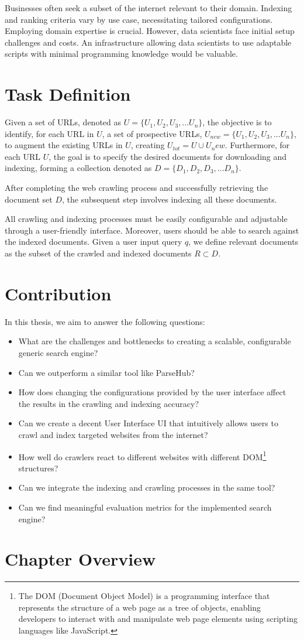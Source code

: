 Businesses often seek a subset of the internet relevant to their domain. Indexing and ranking criteria vary by use case, necessitating tailored configurations. Employing domain expertise is crucial. However, data scientists face initial setup challenges and costs. An infrastructure allowing data scientists to use adaptable scripts with minimal programming knowledge would be valuable. 

\section{Task Definition}
Given a set of URLs, denoted as $U = \{U_1, U_2, U_3, ...U_n\}$, the objective is to identify, for each URL in $U$, a set of prospective URLs, $U_{new} = \{U_1, U_2, U_3, ...U_n\}$, to augment the existing URLs in $U$, creating $U_{tot} = U \cup U{_new}$. Furthermore, for each URL $U$, the goal is to specify the desired documents for downloading and indexing, forming a collection denoted as $D = \{D_1, D_2, D_3, ...D_n\}$.

After completing the web crawling process and successfully retrieving the document set $D$, the subsequent step involves indexing all these documents. 

All crawling and indexing processes must be easily configurable and adjustable through a user-friendly interface. Moreover, users should be able to search against the indexed documents. Given a user input query $q$, we define relevant documents as the subset of the crawled and indexed documents $R \subset D$.

\section{Contribution}

In this thesis, we aim to answer the following questions:

\begin{itemize}
  \item What are the challenges and bottlenecks to creating a scalable, configurable generic search engine?
\item Can we outperform a similar tool like ParseHub?
\item How does changing the configurations provided by the user interface affect the results in the crawling and indexing accuracy?
    \item Can we create a decent User Interface UI that intuitively allows users to crawl and index targeted websites from the internet?
\item How well do crawlers react to different websites with different DOM\footnote{The DOM (Document Object Model) is a programming interface that represents the structure of a web page as a tree of objects, enabling developers to interact with and manipulate web page elements using scripting languages like JavaScript.} structures?
    \item Can we integrate the indexing and crawling processes in the same tool?
    \item Can we find meaningful evaluation metrics for the implemented search engine?
\end{itemize}

\section{Chapter Overview}
